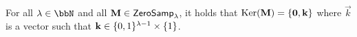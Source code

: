 \begin{lem}
\label{lem:ker2}
For all $\lambda\in\N$ and all $\mathbf{{M}} \in {\mathsf{ZeroSamp}}_\lambda$, it holds that $\operatorname{Ker}(\mathbf{{M}}) = \{\mathbf{0}, \mathbf{k} \}$ where $\vec k$ is a vector such that $\mathbf{k} \in  \{0, 1\}^{\lambda-1}\times \{1\}$.
\end{lem}
